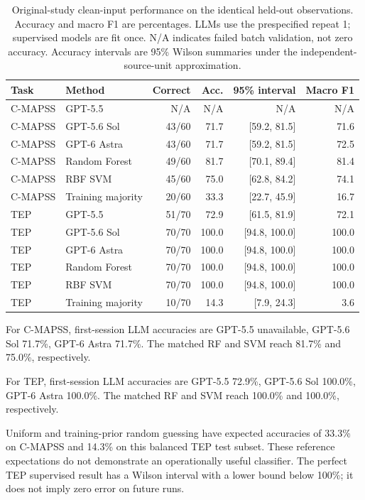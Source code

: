 \documentclass[11pt,a4paper]{article}
\begin{document}
\begin{table}[htbp]
\centering
\small
\caption{Original-study clean-input performance on the identical held-out observations. Accuracy and macro F1 are percentages. LLMs use the prespecified repeat 1; supervised models are fit once. N/A indicates failed batch validation, not zero accuracy. Accuracy intervals are 95\% Wilson summaries under the independent-source-unit approximation.}
\label{tab:primary}
\begin{tabular}{@{}llrrrr@{}}
\toprule
Task & Method & Correct & Acc. & 95\% interval & Macro F1 \\
\midrule
C-MAPSS & GPT-5.5 & N/A & N/A & N/A & N/A \\
C-MAPSS & GPT-5.6 Sol & 43/60 & 71.7 & [59.2, 81.5] & 71.6 \\
C-MAPSS & GPT-6 Astra & 43/60 & 71.7 & [59.2, 81.5] & 72.5 \\
C-MAPSS & Random Forest & 49/60 & 81.7 & [70.1, 89.4] & 81.4 \\
C-MAPSS & RBF SVM & 45/60 & 75.0 & [62.8, 84.2] & 74.1 \\
C-MAPSS & Training majority & 20/60 & 33.3 & [22.7, 45.9] & 16.7 \\
TEP & GPT-5.5 & 51/70 & 72.9 & [61.5, 81.9] & 72.1 \\
TEP & GPT-5.6 Sol & 70/70 & 100.0 & [94.8, 100.0] & 100.0 \\
TEP & GPT-6 Astra & 70/70 & 100.0 & [94.8, 100.0] & 100.0 \\
TEP & Random Forest & 70/70 & 100.0 & [94.8, 100.0] & 100.0 \\
TEP & RBF SVM & 70/70 & 100.0 & [94.8, 100.0] & 100.0 \\
TEP & Training majority & 10/70 & 14.3 & [7.9, 24.3] & 3.6 \\
\bottomrule
\end{tabular}
\end{table}


For C-MAPSS, first-session LLM accuracies are GPT-5.5 unavailable, GPT-5.6 Sol 71.7\%, GPT-6 Astra 71.7\%. The matched RF and SVM reach 81.7\% and 75.0\%, respectively.

For TEP, first-session LLM accuracies are GPT-5.5 72.9\%, GPT-5.6 Sol 100.0\%, GPT-6 Astra 100.0\%. The matched RF and SVM reach 100.0\% and 100.0\%, respectively.

Uniform and training-prior random guessing have expected accuracies of 33.3\% on C-MAPSS and 14.3\% on this balanced TEP test subset. These reference expectations do not demonstrate an operationally useful classifier. The perfect TEP supervised result has a Wilson interval with a lower bound below 100\%; it does not imply zero error on future runs.
\end{document}
